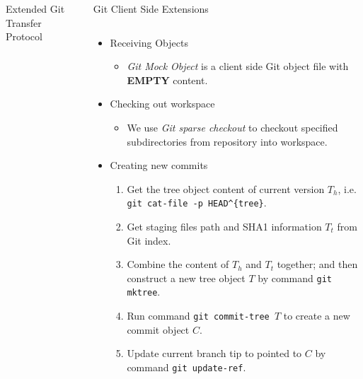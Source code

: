 \documentclass[final]{beamer}
\begin{document}
\begin{frame}[t, fragile]
\begin{columns}[t]
\begin{column}{.49\linewidth}
\begin{block}{Extended Git Transfer Protocol}
      \end{block}
    \end{column}
    \begin{column}{.49\linewidth}
      \begin{block}{Git Client Side Extensions}
        \begin{columns}[T]
            \begin{column}{.5\textwidth}
\begin{itemize}
  \justifying
  \item Receiving Objects
    \begin{itemize}
      \item \emph{Git Mock Object} is a client side Git object file with
        \textbf{EMPTY} content.
    \end{itemize}
  \item Checking out workspace
    \begin{itemize}
    \item We use \emph{Git sparse checkout} to checkout specified
      subdirectories from repository into workspace.
    \end{itemize}
  \item Creating new commits
\begin{enumerate}
  \item Get the tree object content of current version $T_h$, i.e. \\
        \verb|git cat-file -p HEAD^{tree}|.

  \item Get staging files path and SHA1 information $T_t$ from Git index.

  \item Combine the content of $T_h$ and $T_t$ together; and then construct a
        new tree object $T$ by command \verb|git mktree|.

  \item Run command \verb|git commit-tree |$T$ to create a new commit object
        $C$.

  \item Update current branch tip to pointed to $C$ by command
    \verb|git update-ref|.
\end{enumerate}
\end{itemize}


\end{column}
\end{columns}
\end{block}
\end{column}
\end{columns}
\end{frame}
\end{document}
